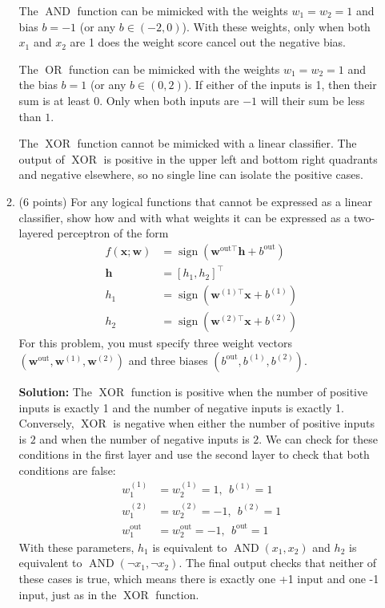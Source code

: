 \documentclass[10pt]{article}
\newcommand{\bx}{{\boldsymbol x}}
\newcommand{\bh}{{\boldsymbol h}}
\newcommand{\bw}{{\boldsymbol w}}
\DeclareMathOperator*{\AND}{AND}
\DeclareMathOperator*{\OR}{OR}
\DeclareMathOperator*{\XOR}{XOR}
\DeclareMathOperator*{\sign}{sign}
\newcommand{\solution}[1]{{\color{PineGreen} \textbf{Solution:} #1}}
\begin{document}
\begin{enumerate}
\begin{enumerate}
{The $\AND$ function can be mimicked with the weights $w_1 = w_2 = 1$ and bias $b = -1$ (or any $b \in (-2, 0)$). With these weights, only when both $x_1$ and $x_2$ are 1 does the weight score cancel out the negative bias.

The $\OR$ function can be mimicked with the weights $w_1 = w_2 = 1$ and the bias $b = 1$ (or any $b \in (0, 2)$). If either of the inputs is 1, then their sum is at least 0. Only when both inputs are $-1$ will their sum be less than $1$.

The $\XOR$ function cannot be mimicked with a linear classifier. The output of $\XOR$ is positive in the upper left and bottom right quadrants and negative elsewhere, so no single line can isolate the positive cases.
}

\item (6 points) For any logical functions that cannot be expressed as a linear classifier, show how and with what weights it can be expressed as a two-layered perceptron of the form
\begin{align}
f(\bx; \bw) &= \sign(\bw^{\mathrm{out}\top} \bh + b^{\mathrm{out}})\\
\bh &= [h_1, h_2]^\top\\
h_1 &= \sign(\bw^{(1)\top} \bx + b^{(1)})\\
h_2 &= \sign(\bw^{(2)\top} \bx + b^{(2)})
\end{align}
For this problem, you must specify three weight vectors $(\bw^{\mathrm{out}}, \bw^{(1)}, \bw^{(2)})$ and three biases $(b^{\mathrm{out}}, b^{(1)}, b^{(2)})$.

\solution{
The $\XOR$ function is positive when the number of positive inputs is exactly 1 and the number of negative inputs is exactly 1. Conversely, $\XOR$ is negative when either the number of positive inputs is $2$ and when the number of negative inputs is $2$. We can check for these conditions in the first layer and use the second layer to check that both conditions are false:
\begin{align}
w^{(1)}_1 &= w^{(1)}_2 = 1, ~~ b^{(1)} = 1\\
w^{(2)}_1 &= w^{(2)}_2 = -1, ~~ b^{(2)} = 1\\
w^{\mathrm{out}}_1 &= w^{\mathrm{out}}_2 = -1, ~~ b^{\mathrm{out}} = 1
\end{align}
With these parameters, $h_1$ is equivalent to $\AND(x_1, x_2)$ and $h_2$ is equivalent to $\AND(\neg x_1, \neg x_2)$. The final output checks that neither of these cases is true, which means there is exactly one +1 input and one -1 input, just as in the $\XOR$ function.
}


\end{enumerate}

\end{enumerate}
\end{document}

